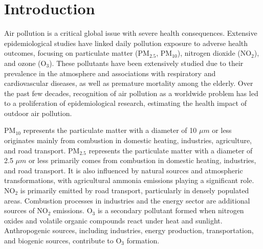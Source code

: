 \documentclass[
  12,
]{article}
\begin{document}
\hypertarget{introduction}{%
\section{Introduction}\label{introduction}}

Air pollution is a critical global issue with severe health
consequences. Extensive epidemiological studies have linked daily
pollution exposure to adverse health outcomes, focusing on particulate
matter (PM\(_{2.5}\), PM\(_{10}\)), nitrogen dioxide (NO\(_2\)), and
ozone (O\(_3\)). These pollutants have been extensively studied due to
their prevalence in the atmosphere and associations with respiratory and
cardiovascular diseases, as well as premature mortality among the
elderly. Over the past few decades, recognition of air pollution as a
worldwide problem has led to a proliferation of epidemiological
research, estimating the health impact of outdoor air pollution.

PM\(_{10}\) represents the particulate matter with a diameter of 10
\(\mu m\) or less originates mainly from combustion in domestic heating,
industries, agriculture, and road transport. PM\(_{2.5}\) represents the
particulate matter with a diameter of 2.5 \(\mu m\) or less primarily
comes from combustion in domestic heating, industries, and road
transport. It is also influenced by natural sources and atmospheric
transformations, with agricultural ammonia emissions playing a
significant role. NO\(_2\) is primarily emitted by road transport,
particularly in densely populated areas. Combustion processes in
industries and the energy sector are additional sources of NO\(_2\)
emissions. O\(_3\) is a secondary pollutant formed when nitrogen oxides
and volatile organic compounds react under heat and sunlight.
Anthropogenic sources, including industries, energy production,
transportation, and biogenic sources, contribute to O\(_3\) formation.
\end{document}
